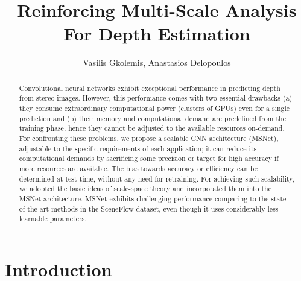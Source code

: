 \documentclass[runningheads]{llncs}
\begin{document}
\pagestyle{headings}
\mainmatter

\def\ECCVSubNumber{6636}

\title{Reinforcing Multi-Scale Analysis For Depth Estimation}
\author{Vasilis Gkolemis, Anastasios Delopoulos}

\maketitle

\begin{abstract}
Convolutional neural networks exhibit exceptional performance in predicting depth from stereo images. However, this performance comes with two essential drawbacks (a) they consume extraordinary computational power (clusters of GPUs) even for a single prediction and (b) their memory and computational demand are predefined from the training phase, hence they cannot be adjusted to the available resources on-demand.
For confronting these problems, we propose a scalable CNN architecture (MSNet), adjustable to the specific requirements of each application; it can reduce its computational demands by sacrificing some precision or target for high accuracy if more resources are available. The bias towards accuracy or efficiency can be determined at test time, without any need for retraining. For achieving such scalability, we adopted the basic ideas of scale-space theory and incorporated them into the MSNet architecture.
MSNet exhibits challenging performance comparing to the state-of-the-art methods in the SceneFlow dataset, even though it uses considerably less learnable parameters. 

\end{abstract}

\section{Introduction}
\end{document}
